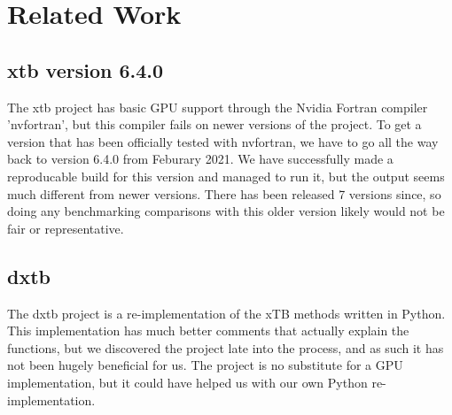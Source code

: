 \chapter{Related Work}

\section{xtb version 6.4.0}
The xtb project has basic GPU support through the Nvidia Fortran compiler 'nvfortran', but this compiler fails on newer versions of the project. To get a version that has been officially tested with nvfortran, we have to go all the way back to version 6.4.0 from Feburary 2021.
We have successfully made a reproducable build for this version and managed to run it, but the output seems much different from newer versions. There has been released 7 versions since, so doing any benchmarking comparisons with this older version likely would not be fair or representative.

\section{dxtb}
The dxtb project is a re-implementation of the xTB methods written in Python. This implementation has much better comments that actually explain the functions, but we discovered the project late into the process, and as such it has not been hugely beneficial for us.
The project is no substitute for a GPU implementation, but it could have helped us with our own Python re-implementation.
